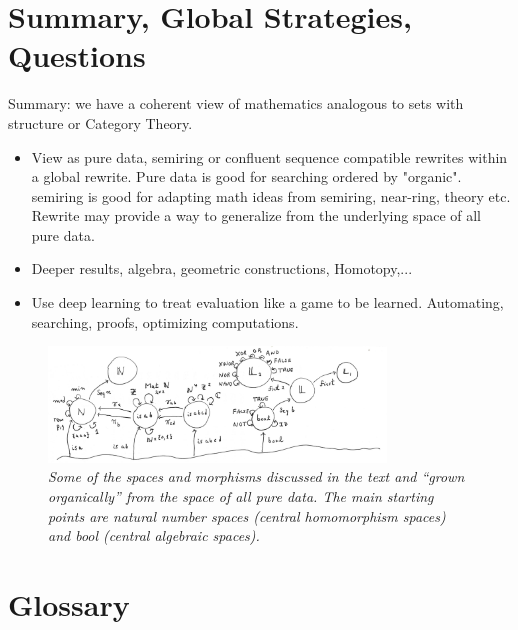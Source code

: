 \documentclass[11pt]{article}
\begin{document}
\section{Summary, Global Strategies, Questions} 

Summary:  we have a coherent view of mathematics analogous to sets with structure or Category Theory.  
\begin{itemize}
\item{View as pure data, semiring or confluent sequence compatible rewrites within a global rewrite.  Pure data is good for searching ordered by "organic".  
semiring is good for adapting math ideas from semiring, near-ring, theory etc.  Rewrite may provide a way to generalize from the underlying space 
of all pure data.} 
\item{Deeper results, algebra, geometric constructions, Homotopy,...} 
\item{Use deep learning to treat evaluation like a game to be learned.  Automating, searching, proofs, optimizing computations.} 
\end{itemize}


\begin{figure}[h]
\centering
\includegraphics[width=0.8\textwidth]{garden.png}
\caption{{\it Some of the spaces and morphisms discussed in the text and ``grown organically'' from the space of all pure data. 
The main starting points are natural number spaces (central homomorphism spaces) and bool (central algebraic spaces).}}
\end{figure}

\section{Glossary}
\end{document}
